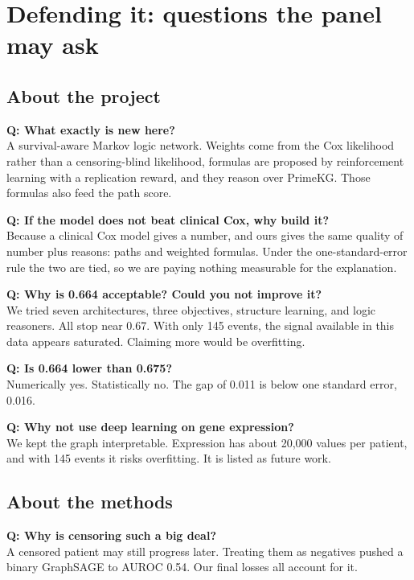 \documentclass[11pt,a4paper]{article}
\begin{document}
\section{Defending it: questions the panel may ask}
\subsection{About the project}
\textbf{Q: What exactly is new here?}\\
A survival-aware Markov logic network. Weights come from the Cox likelihood rather than a censoring-blind likelihood, formulas are proposed by reinforcement learning with a replication reward, and they reason over PrimeKG. Those formulas also feed the path score.

\textbf{Q: If the model does not beat clinical Cox, why build it?}\\
Because a clinical Cox model gives a number, and ours gives the same quality of number plus reasons: paths and weighted formulas. Under the one-standard-error rule the two are tied, so we are paying nothing measurable for the explanation.

\textbf{Q: Why is 0.664 acceptable? Could you not improve it?}\\
We tried seven architectures, three objectives, structure learning, and logic reasoners. All stop near 0.67. With only 145 events, the signal available in this data appears saturated. Claiming more would be overfitting.

\textbf{Q: Is 0.664 lower than 0.675?}\\
Numerically yes. Statistically no. The gap of 0.011 is below one standard error, 0.016.

\textbf{Q: Why not use deep learning on gene expression?}\\
We kept the graph interpretable. Expression has about 20,000 values per patient, and with 145 events it risks overfitting. It is listed as future work.

\subsection{About the methods}
\textbf{Q: Why is censoring such a big deal?}\\
A censored patient may still progress later. Treating them as negatives pushed a binary GraphSAGE to AUROC 0.54. Our final losses all account for it.
\end{document}

